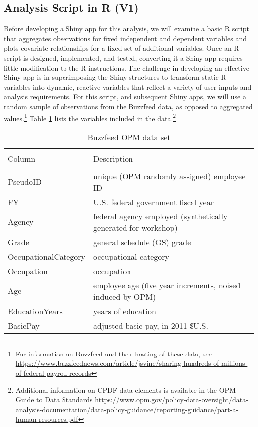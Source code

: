 \documentclass[10pt, letterpaper]{article}
\begin{document}
\begin{spacing}{1.0}

\subsection{Analysis Script in R (V1)}\label{sec:appdev01}

Before developing a Shiny app for this analysis, we will examine a basic R script that aggregates observations for fixed independent and dependent variables and plots covariate relationships for a fixed set of additional variables.  Once an R script is designed, implemented, and tested, converting it a Shiny app requires little modification to the R instructions.  The challenge in developing an effective Shiny app is in superimposing the Shiny structures to transform static R variables into dynamic, reactive variables that reflect a variety of user inputs and analysis requirements.  For this script, and subsequent Shiny apps, we will use a random sample of observations from the Buzzfeed data, as opposed to aggregated values.\footnote{For information on Buzzfeed and their hosting of these data, see \url{https://www.buzzfeednews.com/article/jsvine/sharing-hundreds-of-millions-of-federal-payroll-records}} Table \ref{tb:buzzfeeddata} lists the variables included in the data.\footnote{Additional information on CPDF data elements is available in the OPM Guide to Data Standards \url{https://www.opm.gov/policy-data-oversight/data-analysis-documentation/data-policy-guidance/reporting-guidance/part-a-human-resources.pdf}}

\vspace{10pt}

\begin{table}[H]
    \caption{Buzzfeed OPM data set}
    \centering
    \begin{tabular}{ll}
        \hline & \\[-8pt]
        Column & Description \\[1pt]
        \hline & \\[-4pt]
        PseudoID & unique (OPM randomly assigned) employee ID \\
        FY & U.S. federal government fiscal year \\
        Agency & federal agency employed (synthetically generated for workshop) \\
        Grade & general schedule (GS) grade \\
        OccupationalCategory & occupational category \\ 
        Occupation & occupation \\
        Age & employee age (five year increments, noised induced by OPM) \\
        EducationYears & years of education \\
        BasicPay & adjusted basic pay, in 2011 \$U.S. \\
    \end{tabular}
    \label{tb:buzzfeeddata}
\end{table}


\end{spacing}
\end{document}

